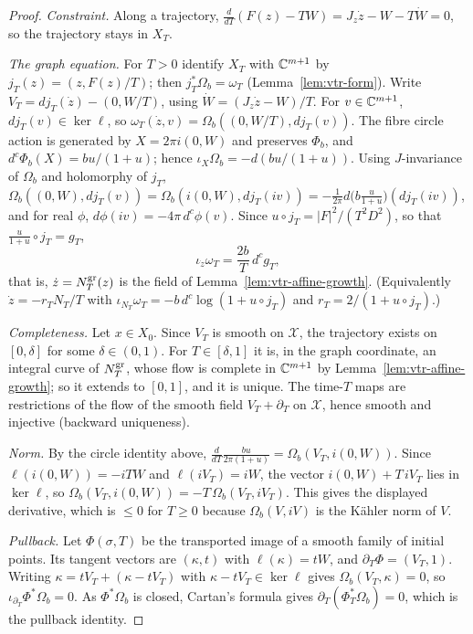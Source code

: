 \begin{proof}
\emph{Constraint.} Along a trajectory, $\frac d{dT}(F(z)-TW)=J_z\dot z-W-T\dot W=0$, so the trajectory stays in $X_T$.

\emph{The graph equation.} For $T>0$ identify $X_T$ with $\mathbb{C}^{m+1}$ by $j_T(z)=(z,F(z)/T)$; then $j_T^*\Omega_b=\omega_T$
(Lemma~\ref{lem:vtr-form}). Write $V_T=dj_T(\dot z)-(0,W/T)$, using $\dot W=(J_z\dot z-W)/T$. For $v\in\mathbb{C}^{m+1}$,
$dj_T(v)\in\ker\ell$, so $\omega_T(\dot z,v)=\Omega_b((0,W/T),dj_T(v))$. The fibre circle action is generated by $X=2\pi i(0,W)$ and
preserves $\Phi_b$, and $d^c\Phi_b(X)=bu/(1+u)$; hence $\iota_X\Omega_b=-d(bu/(1+u))$. Using $J$-invariance of $\Omega_b$ and
holomorphy of $j_T$, $\Omega_b((0,W),dj_T(v))=\Omega_b(i(0,W),dj_T(iv))=-\frac1{2\pi}d\bigl(b\tfrac u{1+u}\bigr)(dj_T(iv))$, and for
real $\phi$, $d\phi(iv)=-4\pi\,d^c\phi(v)$. Since $u\circ j_T=|F|^2/(T^2D^2)$, so that $\frac u{1+u}\circ j_T=g_T$,
\[
 \iota_{\dot z}\omega_T=\frac{2b}T\,d^cg_T ,
\]
that is, $\dot z=N^{\rm gr}_T(z)$ is the field of Lemma~\ref{lem:vtr-affine-growth}. (Equivalently $\dot z=-r_TN_T/T$ with
$\iota_{N_T}\omega_T=-b\,d^c\log(1+u\circ j_T)$ and $r_T=2/(1+u\circ j_T)$.)

\emph{Completeness.} Let $x\in X_0$. Since $V_T$ is smooth on $\mathcal X$, the trajectory exists on $[0,\delta]$ for some
$\delta\in(0,1)$. For $T\in[\delta,1]$ it is, in the graph coordinate, an integral curve of $N^{\rm gr}_T$, whose flow is complete
in $\mathbb{C}^{m+1}$ by Lemma~\ref{lem:vtr-affine-growth}; so it extends to $[0,1]$, and it is unique. The time-$T$ maps are restrictions
of the flow of the smooth field $V_T+\partial_T$ on $\mathcal X$, hence smooth and injective (backward uniqueness).

\emph{Norm.} By the circle identity above, $\frac d{dT}\frac{bu}{2\pi(1+u)}=\Omega_b(V_T,i(0,W))$. Since $\ell(i(0,W))=-iTW$ and
$\ell(iV_T)=iW$, the vector $i(0,W)+T\,iV_T$ lies in $\ker\ell$, so $\Omega_b(V_T,i(0,W))=-T\,\Omega_b(V_T,iV_T)$. This gives the
displayed derivative, which is $\le0$ for $T\ge0$ because $\Omega_b(V,iV)$ is the Kähler norm of $V$.

\emph{Pullback.} Let $\Phi(\sigma,T)$ be the transported image of a smooth family of initial points. Its tangent vectors are
$(\kappa,t)$ with $\ell(\kappa)=tW$, and $\partial_T\Phi=(V_T,1)$. Writing $\kappa=tV_T+(\kappa-tV_T)$ with $\kappa-tV_T\in\ker\ell$
gives $\Omega_b(V_T,\kappa)=0$, so $\iota_{\partial_T}\Phi^*\Omega_b=0$. As $\Phi^*\Omega_b$ is closed, Cartan's formula gives
$\partial_T(\Phi_T^*\Omega_b)=0$, which is the pullback identity.
\end{proof}

